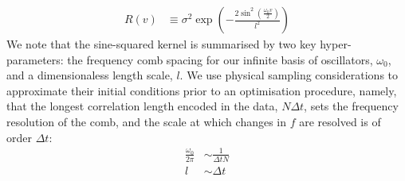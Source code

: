 \begin{align}
R(v) &\equiv \sigma^2 \exp (- \frac{2\sin^2(\frac{\omega_0 v}{2})}{l^2}) 
\end{align}
We note that the sine-squared kernel is summarised by two key hyper-parameters: the frequency comb spacing for our infinite basis of oscillators, $\omega_0$, and a dimensionaless length scale, $l$. We use physical sampling considerations to approximate their initial conditions prior to an optimisation procedure, namely, that the longest correlation length encoded in the data, $N \Delta t $, sets the frequency resolution of the comb, and the scale at which changes in $f$ are resolved is of order  $\Delta t$:
\begin{align}
\frac{\omega_0}{2\pi} & \sim  \frac{1}{\Delta t N} \\
l & \sim \Delta t
\end{align}
